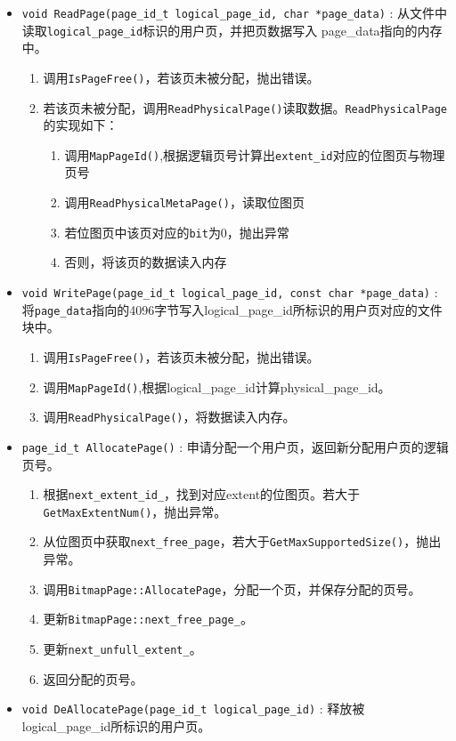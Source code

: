 \documentclass[12pt, a4paper]{article}
\def\c#1{\texttt{#1}}
\begin{document}
\begin{itemize}
	\item \c{void\ ReadPage(page\_id\_t logical\_page\_id, char *page\_data)} : 从文件中读取\c{logical\_page\_id}标识的用户页，并把页数据写入 page\_data指向的内存中。\begin{enumerate}
  \item 调用\c{IsPageFree()}，若该页未被分配，抛出错误。
  \item 若该页未被分配，调用\c{ReadPhysicalPage()}读取数据。\c{ReadPhysicalPage}的实现如下：\begin{enumerate}
	  \item 调用\c{MapPageId()},根据逻辑页号计算出\c{extent\_id}对应的位图页与物理页号
   \item 调用\c{ReadPhysicalMetaPage()}，读取位图页
   \item 若位图页中该页对应的\c{bit}为0，抛出异常
   \item 否则，将该页的数据读入内存
  \end{enumerate}
	\end{enumerate}
 \item \c{void WritePage(page\_id\_t logical\_page\_id, const char *page\_data)} : 将\c{page\_data}指向的4096字节写入logical\_page\_id所标识的用户页对应的文件块中。\begin{enumerate}
 \item 调用\c{IsPageFree()}，若该页未被分配，抛出错误。
   \item 调用\c{MapPageId()},根据logical\_page\_id计算physical\_page\_id。
   \item 调用\c{ReadPhysicalPage()}，将数据读入内存。
 \end{enumerate}
 \item \c{page\_id\_t AllocatePage()} : 申请分配一个用户页，返回新分配用户页的逻辑页号。\begin{enumerate}
   \item 根据\c{next\_extent\_id\_}，找到对应extent的位图页。若大于\c{GetMaxExtentNum()}，抛出异常。
   \item 从位图页中获取\c{next\_free\_page}，若大于\c{GetMaxSupportedSize()}，抛出异常。
   \item 调用\c{BitmapPage::AllocatePage}，分配一个页，并保存分配的页号。
   \item 更新\c{BitmapPage::next\_free\_page\_}。
   \item 更新\c{next\_unfull\_extent\_}。
   \item 返回分配的页号。
 \end{enumerate}
 \item \c{void DeAllocatePage(page\_id\_t logical\_page\_id)} : 释放被logical\_page\_id所标识的用户页。\begin{enumerate}

\end{enumerate}
\end{itemize}
\end{document}

